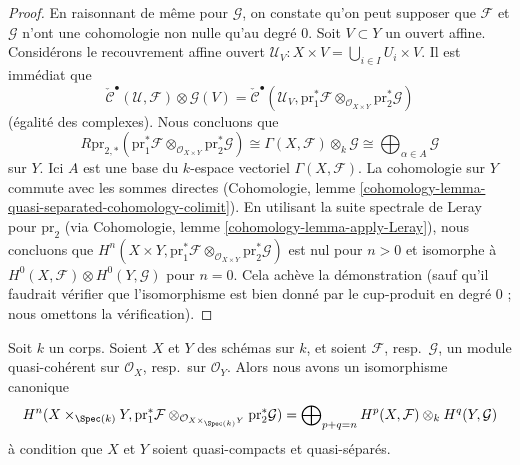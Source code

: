 \begin{proof}
\medskip\noindent
 En raisonnant de même pour $\mathcal{G}$, on constate
qu'on peut supposer que $\mathcal{F}$ et $\mathcal{G}$
 n'ont une cohomologie non nulle qu'au degré $0$.
 Soit $V \subset Y$ un ouvert affine. Considérons le recouvrement affine ouvert 
$\mathcal{U}_V : X \times V = \bigcup_{i \in I} U_i \times V$.
Il est immédiat que 
$$
\check{\mathcal{C}}^\bullet(\mathcal{U}, \mathcal{F}) \otimes \mathcal{G}(V) =
\check{\mathcal{C}}^\bullet(\mathcal{U}_V,
\text{pr}_1^*\mathcal{F} \otimes_{\mathcal{O}_{X \times Y}}
\text{pr}_2^*\mathcal{G})
$$
 (égalité des complexes). Nous concluons que 
$$
R\text{pr}_{2, *}(\text{pr}_1^*\mathcal{F} \otimes_{\mathcal{O}_{X \times Y}}
\text{pr}_2^*\mathcal{G})
\cong
\Gamma(X, \mathcal{F}) \otimes_k \mathcal{G} \cong
\bigoplus\nolimits_{\alpha \in A} \mathcal{G}
$$
 sur $Y$. Ici $A$ est une base du $k$-espace vectoriel $\Gamma(X, \mathcal{F})$.
La cohomologie sur $Y$ commute avec les sommes
directes (Cohomologie, lemme \ref{cohomology-lemma-quasi-separated-cohomology-colimit}).
En utilisant la suite spectrale de Leray pour $\text{pr}_2$
 (via Cohomologie, lemme \ref{cohomology-lemma-apply-Leray}),
nous concluons que 
$H^n(X \times Y, \text{pr}_1^*\mathcal{F} \otimes_{\mathcal{O}_{X \times Y}}
\text{pr}_2^*\mathcal{G})$
 est nul pour $n > 0$ et isomorphe à 
$H^0(X, \mathcal{F}) \otimes H^0(Y, \mathcal{G})$ pour $n = 0$.
 Cela achève la démonstration (sauf qu'il faudrait vérifier que
l’isomorphisme est bien donné par le cup-produit en degré $0$ ;
nous omettons la vérification). 
\end{proof}

\begin{lemma}
\label{lemma-kunneth-general}
 Soit $k$ un corps. Soient $X$ et $Y$ des schémas sur $k$, et
soient $\mathcal{F}$, resp.\ $\mathcal{G}$, un module quasi-cohérent sur 
$\mathcal{O}_X$, resp.\ sur $\mathcal{O}_Y$.
Alors nous avons un isomorphisme canonique 
$$
H^n(X \times_{\Spec(k)} Y, \text{pr}_1^*\mathcal{F}
\otimes_{\mathcal{O}_{X \times_{\Spec(k)} Y}} \text{pr}_2^*\mathcal{G}) =
\bigoplus\nolimits_{p + q = n}
H^p(X, \mathcal{F}) \otimes_k H^q(Y, \mathcal{G})
$$
 à condition que $X$ et $Y$ soient quasi-compacts et quasi-séparés. 
\end{lemma}

